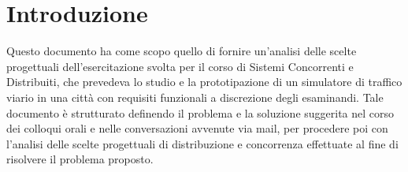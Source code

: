 \section{Introduzione}
Questo documento ha come scopo quello di fornire un'analisi delle scelte
progettuali dell'esercitazione svolta per il corso di Sistemi Concorrenti e
Distribuiti, che prevedeva lo studio e la prototipazione di un simulatore di
traffico viario in una città con requisiti funzionali a discrezione degli
esaminandi. Tale documento è strutturato definendo il problema e la soluzione
suggerita nel corso dei colloqui orali e nelle conversazioni avvenute via mail,
per procedere poi con l'analisi delle scelte progettuali di distribuzione e
concorrenza effettuate al fine di risolvere il problema proposto.
